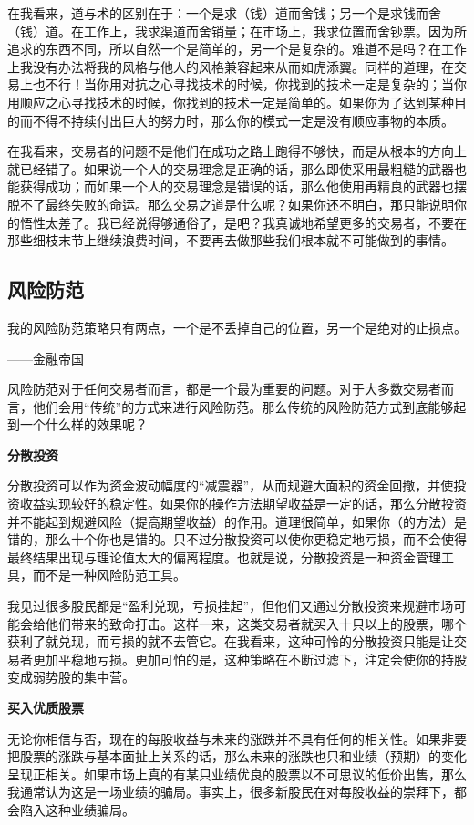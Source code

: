 在我看来，道与术的区别在于：一个是求（钱）道而舍钱；另一个是求钱而舍（钱）道。在工作上，我求渠道而舍销量；在市场上，我求位置而舍钞票。因为所追求的东西不同，所以自然一个是简单的，另一个是复杂的。难道不是吗？在工作上我没有办法将我的风格与他人的风格兼容起来从而如虎添翼。同样的道理，在交易上也不行！当你用对抗之心寻找技术的时候，你找到的技术一定是复杂的；当你用顺应之心寻找技术的时候，你找到的技术一定是简单的。如果你为了达到某种目的而不得不持续付出巨大的努力时，那么你的模式一定是没有顺应事物的本质。

在我看来，交易者的问题不是他们在成功之路上跑得不够快，而是从根本的方向上就已经错了。如果说一个人的交易理念是正确的话，那么即使采用最粗糙的武器也能获得成功；而如果一个人的交易理念是错误的话，那么他使用再精良的武器也摆脱不了最终失败的命运。那么交易之道是什么呢？如果你还不明白，那只能说明你的悟性太差了。我已经说得够通俗了，是吧？我真诚地希望更多的交易者，不要在那些细枝末节上继续浪费时间，不要再去做那些我们根本就不可能做到的事情。

\subsection{风险防范}

{\kaishu
我的风险防范策略只有两点，一个是不丢掉自己的位置，另一个是绝对的止损点。

\hfill ——金融帝国
}

风险防范对于任何交易者而言，都是一个最为重要的问题。对于大多数交易者而言，他们会用“传统”的方式来进行风险防范。那么传统的风险防范方式到底能够起到一个什么样的效果呢？

\textbf{分散投资}

分散投资可以作为资金波动幅度的“减震器”，从而规避大面积的资金回撤，并使投资收益实现较好的稳定性。如果你的操作方法期望收益是一定的话，那么分散投资并不能起到规避风险（提高期望收益）的作用。道理很简单，如果你（的方法）是错的，那么十个你也是错的。只不过分散投资可以使你更稳定地亏损，而不会使得最终结果出现与理论值太大的偏离程度。也就是说，分散投资是一种资金管理工具，而不是一种风险防范工具。

我见过很多股民都是“盈利兑现，亏损挂起”，但他们又通过分散投资来规避市场可能会给他们带来的致命打击。这样一来，这类交易者就买入十只以上的股票，哪个获利了就兑现，而亏损的就不去管它。在我看来，这种可怜的分散投资只能是让交易者更加平稳地亏损。更加可怕的是，这种策略在不断过滤下，注定会使你的持股变成弱势股的集中营。

\textbf{买入优质股票}

无论你相信与否，现在的每股收益与未来的涨跌并不具有任何的相关性。如果非要把股票的涨跌与基本面扯上关系的话，那么未来的涨跌也只和业绩（预期）的变化呈现正相关。如果市场上真的有某只业绩优良的股票以不可思议的低价出售，那么我通常认为这是一场业绩的骗局。事实上，很多新股民在对每股收益的崇拜下，都会陷入这种业绩骗局。

